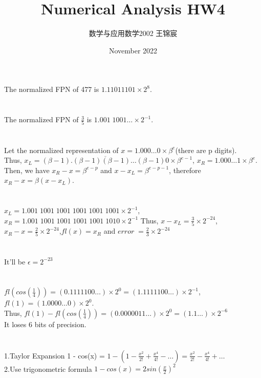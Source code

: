 \documentclass[UTF8]{ctexart}
\title{Numerical Analysis HW4}
\author{数学与应用数学2002 王锦宸 }
\date{November 2022}
\begin{document}
\maketitle
\section{}
 The normalized FPN of 477 is $1.11011101 \times 2^8$.
\section{}
 The normalized FPN of $\frac{3}{5}$ is $1.001\;1001\dots \times 2^{-1}$.
\section{}
 Let the normalized representation of $x = 1.000\dots0 \times \beta ^e$(there are p digits).\\
Thus, $x_L = \overline{(\beta -1).(\beta-1)(\beta-1)\dots(\beta-1)0} \times \beta ^{e-1}$, $x_R = 1.000\dots1 \times \beta^e$.\\
Then, we have $x_R - x = \beta ^{e-p}$ and $x - x_L = \beta ^{e-p-1}$, therefore $x_R - x = \beta(x-x_L)$.
\section{}
 $x_L = 1.001\; 1001\; 1001\; 1001\; 1001\; 1001 \times 2^{-1}$, $x_R = 1.001\;1001\;1001\;1001\;1001\;1010 \times 2^{-1}$
Thus, $x-x_L = \frac{3}{5} \times 2^{-24}$, $x_R - x = \frac{2}{5} \times 2^{-24}$,$fl(x) = x_R$ and $error\;=\frac{2}{3} \times 2^{-24}$
\section{}
 It'll be $\epsilon = 2 ^{-23}$
\section{}
 \noindent $fl(cos(\frac{1}{4})) = (0.1111100\dots) \times 2^{0} =(1.1111100\dots) \times 2^{-1}$, \\$fl(1) = (1.0000\dots0 )\times 2^0$.\\
Thus, $fl(1) - fl(cos(\frac{1}{4})) = (0.0000011\dots) \times 2^0 = (1.1\dots) \times 2^{-6}$\\
It loses 6 bits of precision.
\section{}
 \noindent 1.Taylor Expansion   1 - cos(x) = $1 - (1-\frac{x^2}{2!}+\frac{x^4}{4!}-\dots) = \frac{x^2}{2!}-\frac{x^4}{4!}+\dots$\\
2.Use trigonometric formula   $1 - cos(x) = 2sin(\frac{x}{2})^2$
\end{document}
